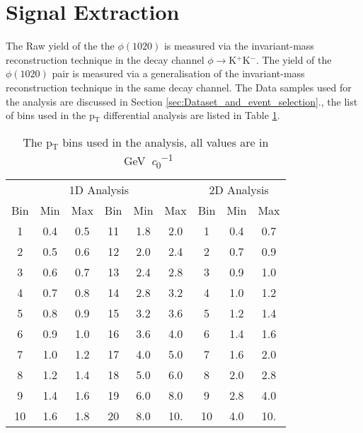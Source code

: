 \section{Signal Extraction}
\label{sec:SignalExtraction}
The Raw yield of the the $\phi(1020)$ is measured via the invariant-mass reconstruction technique in the decay channel $\phi \to $K$^+$K$^-$. The yield of the $\phi(1020)$ pair is measured via a generalisation of the invariant-mass reconstruction technique in the same decay channel. The Data samples used for the analysis are discussed in Section \ref{sec:Dataset_and_event_selection}., the list of bins used in the p$_{\text{T}}$ differential analysis are listed in Table \ref{tab:PTbins}.
\begin{table}
\center
\begin{tabular}{ccc|ccc||ccc}
\multicolumn{6}{c}{1D Analysis} 					&\multicolumn{3}{c}{2D Analysis}\\
Bin	&Min		&Max	&Bin		&Min		&Max	&Bin		&Min		&Max\\
\hline
1	&0.4		&0.5		&11		&1.8		&2.0		&1		&0.4		&0.7\\
2	&0.5		&0.6		&12		&2.0		&2.4		&2		&0.7		&0.9\\
3	&0.6		&0.7		&13		&2.4		&2.8		&3		&0.9		&1.0\\
4	&0.7		&0.8		&14		&2.8		&3.2		&4		&1.0		&1.2\\
5	&0.8		&0.9		&15		&3.2		&3.6		&5		&1.2		&1.4\\
6	&0.9		&1.0		&16		&3.6		&4.0		&6		&1.4		&1.6\\
7	&1.0		&1.2		&17		&4.0		&5.0		&7		&1.6		&2.0\\
8	&1.2		&1.4		&18		&5.0		&6.0		&8		&2.0		&2.8\\
9	&1.4		&1.6		&19		&6.0		&8.0		&9		&2.8		&4.0\\
10	&1.6		&1.8		&20 		&8.0		&10.		&10		&4.0		&10.\\
\end{tabular}
\caption{The p$_{\text{T}}$ bins used in the analysis, all values are in \SI{}{\giga \electronvolt \per \clight}}
\label{tab:PTbins}
\end{table}

